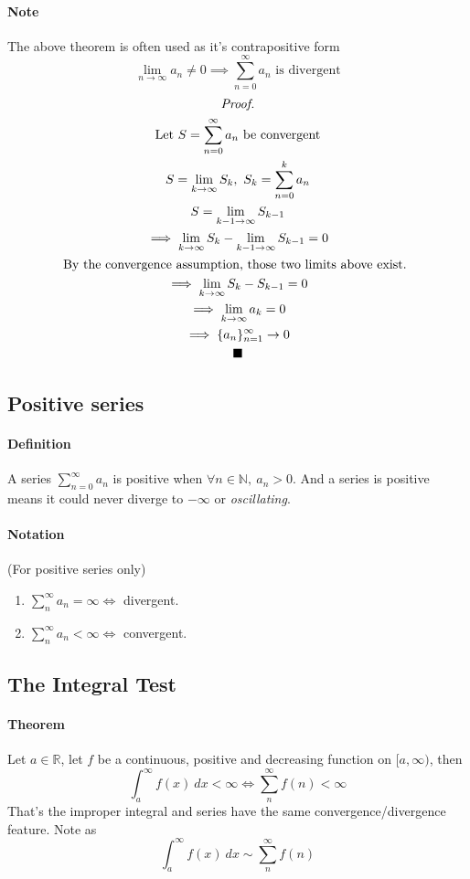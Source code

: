 \documentclass{article}
\newcommand{\R}[0]{\mathbb{R}}
\newcommand{\definition}[0]{\paragraph{Definition}}
\newcommand{\theorem}[0]{\paragraph{Theorem}}
\newcommand{\sequence}[3]{\{#1_{n}\}_{n={#2}}^{#3}}
\newcommand{\N}[0]{\mathbb{N}}
\newcommand{\series}[2]{\sum_{#1}^{\infty}{#2}}
\begin{document}
\paragraph{Note} The above theorem is often used as it's contrapositive form
\[
	\lim_{n\to\infty}{a_n} \neq 0 \implies \series{n=0}{a_n} \text{ is divergent}
\]
\begin{multline*}
	\emph{Proof.} \\
	\text{Let } S = \series{n=0}{a_n} \text{ be convergent} \\
	S = \lim_{k\to\infty}{S_k},\ S_k = \sum_{n=0}^{k}{a_n} \\
	S = \lim_{k - 1 \to \infty}{S_{k-1}} \\
	\implies \lim_{k\to\infty}{S_k} - \lim_{k - 1 \to \infty}{S_{k-1}} = 0 \\
	\text{By the convergence assumption, those two limits above exist. } \\
	\implies \lim_{k\to\infty}{S_k - S_{k-1}} = 0\\
	\implies \lim_{k\to\infty}{a_k} = 0\\
	\implies \sequence{a}{1}{\infty} \to 0 \\
	\blacksquare
\end{multline*}

\subsection{Positive series}
\definition A series $\series{n=0}{a_n}$ is positive when $\forall n \in \N,\ a_n > 0$. And a series is positive means it could never diverge to $-\infty$ or \emph{oscillating}.

\paragraph{Notation} (For positive series only)
\begin{enumerate}
	\item $\series{n}{a_n} = \infty \iff$ divergent.
	\item $\series{n}{a_n} < \infty \iff$ convergent.
\end{enumerate}

\subsection{The Integral Test}
\theorem Let $a \in \R$, let $f$ be a continuous, positive and decreasing function on $[a, \infty)$, then 
\[
	\int_{a}^{\infty}{f(x)\ dx} < \infty \iff \series{n}{f(n)} < \infty
\]
That's the improper integral and series have the same convergence/divergence feature.
Note as 
\[
	\int_{a}^{\infty}{f(x)\ dx} \sim \series{n}{f(n)}
\]
\end{document}
